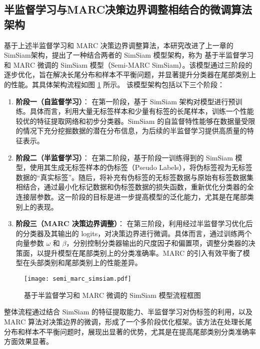 \documentclass[master]{thesis-uestc}
\begin{document}
\subsection{半监督学习与MARC决策边界调整相结合的微调算法架构}

基于上述半监督学习和 MARC 决策边界调整算法，本研究改进了上一章的SimSiam架构，提出了一种结合两者的 SimSiam 模型架构，称为 基于半监督学习和 MARC 微调的 SimSiam 模型（Semi-MARC SimSiam）。该模型通过三阶段的逐步优化，旨在解决长尾分布和样本不平衡问题，并显著提升分类器在尾部类别上的性能。其具体架构流程如图 \ref{semi_marc_simsiam} 所示。
该模型架构包括以下三个阶段：

\begin{enumerate}
    \item \textbf{阶段一（自监督学习）}：  
    在第一阶段，基于 SimSiam 架构对模型进行预训练。具体而言，利用大量无标签样本和少量有标签的长尾样本，训练一个性能较优的特征提取网络和初步分类器。SimSiam 的自监督特性能够在数据量受限的情况下充分挖掘数据的潜在分布信息，为后续的半监督学习提供高质量的特征表示。

    \item \textbf{阶段二（半监督学习）}：  
    在第二阶段，基于阶段一训练得到的 SimSiam 模型，使用其生成无标签样本的伪标签（Pseudo Labels），将伪标签视为无标签数据的“真实标签”。随后，将补充有伪标签的无标签数据与原始有标签数据集相结合，通过最小化标记数据和伪标签数据的损失函数，重新优化分类器的全连接层参数。这一阶段的目标是进一步提高模型的泛化能力，尤其是在尾部类别上的表现。

    \item \textbf{阶段三（MARC 决策边界调整）}：  
    在第三阶段，利用经过半监督学习优化后的分类器及其输出的 logits，对决策边界进行微调。具体而言，通过训练两个向量参数 $\omega$ 和 $\beta$，分别控制分类器输出的尺度因子和偏置项，调整分类器的决策面，以提升模型在尾部类别上的分类准确率。MARC 的引入有效平衡了模型在头部类别和尾部类别上的性能差异。
\end{enumerate}

\begin{figure}[h]
    \centering
    \texttt{[image: semi\_marc\_simsiam.pdf]}
    \caption{基于半监督学习和 MARC 微调的 SimSiam 模型流程框图}
    \label{semi_marc_simsiam}
\end{figure}

整体流程通过结合 SimSiam 的特征提取能力、半监督学习对伪标签的利用，以及 MARC 算法对决策边界的微调，形成了一个多阶段优化框架。该方法在处理长尾分布和样本不平衡问题时，展现出显著的优势，尤其是在提高尾部类别分类准确率方面效果显著。
\end{document}
